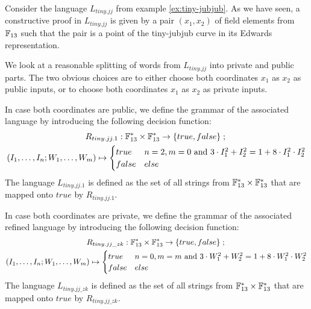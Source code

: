 \begin{example} Consider the language $L_{tiny.jj}$ from example \ref{ex:tiny-jubjub}. As we have seen, a constructive proof in $L_{tiny.jj}$ is given by a pair $(x_1,x_2)$ of field elements from $\mathbb{F}_{13}$ such that the pair is a point of the tiny-jubjub curve in its Edwards representation.

We look at a reasonable splitting of words from $L_{tiny.jj}$ into private and public parts. The two obvious choices are to either choose both coordinates $x_1$ as $x_2$ as public inputs, or to choose both coordinates $x_1$ as $x_2$ as private inputs. 

In case both coordinates are public, we define the grammar of the associated language by introducing the following decision function:
\begin{multline*}
R_{tiny.jj.1} : \mathbb{F}_{13}^*\times \mathbb{F}_{13}^* \to \{true, false\}\;;\;\\
(I_1,\ldots,I_n;W_1,\ldots,W_m) \mapsto
\begin{cases}
true & n=2, m=0 \text{ and } 3\cdot I_1^2 + I_2^2 = 1+ 8\cdot I_1^2\cdot I_2^2\\
false & else
\end{cases}
\end{multline*}
The language $L_{tiny.jj.1}$ is defined as the set of all strings from $\mathbb{F}_{13}^*\times \mathbb{F}_{13}^*$ that are mapped onto $true$ by $R_{tiny.jj.1}$. 

In case both coordinates are private, we define the grammar of the associated refined language by introducing the following decision function:
\begin{multline*}
R_{tiny.jj\_zk} : \mathbb{F}_{13}^*\times \mathbb{F}_{13}^* \to \{true, false\}\;;\;\\
(I_1,\ldots,I_n;W_1,\ldots,W_m) \mapsto
\begin{cases}
true & n=0, m=m \text{ and } 3\cdot W_1^2 + W_2^2 = 1+ 8\cdot W_1^2\cdot W_2^2\\
false & else
\end{cases}
\end{multline*}
The language $L_{tiny.jj\_zk}$ is defined as the set of all strings from $\mathbb{F}_{13}^*\times \mathbb{F}_{13}^*$ that are mapped onto $true$ by $R_{tiny.jj\_zk}$. 
\end{example}
